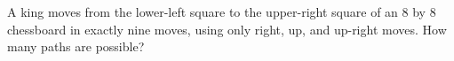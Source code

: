 A king moves from the lower-left square to the upper-right square of an $8$ by $8$ chessboard in exactly nine moves, using only right, up, and up-right moves. How many paths are possible?
